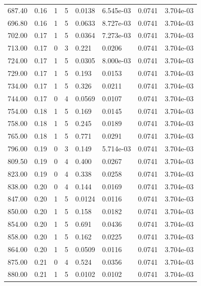 \documentclass[preview]{standalone}
\begin{document}
{{{{\begin{tabular}{L{1.2cm}C{1.2cm} C{0.3cm}C{0.5cm} C{1.4cm}C{1.4cm} C{1.4cm}C{1.4cm}}
  687.40  &  0.16  & 1     &  5 &  0.0138  & 6.545e-03  & 0.0741 &  3.704e-03   \\ 
  696.80  &  0.16  & 1     &  5 &  0.0633  & 8.727e-03  & 0.0741 &  3.704e-03   \\ 
  702.00  &  0.17  & 1     &  5 &  0.0364  & 7.273e-03  & 0.0741 &  3.704e-03   \\ 
  713.00  &  0.17  & 0     &  3 &  0.221  & 0.0206  & 0.0741 &  3.704e-03   \\ 
  724.00  &  0.17  & 1     &  5 &  0.0305  & 8.000e-03  & 0.0741 &  3.704e-03   \\ 
  729.00  &  0.17  & 1     &  5 &  0.193  & 0.0153  & 0.0741 &  3.704e-03   \\ 
  734.00  &  0.17  & 1     &  5 &  0.326  & 0.0211  & 0.0741 &  3.704e-03   \\ 
  744.00  &  0.17  & 0     &  4 &  0.0569  & 0.0107  & 0.0741 &  3.704e-03   \\ 
  754.00  &  0.18  & 1     &  5 &  0.169  & 0.0145  & 0.0741 &  3.704e-03   \\ 
  758.00  &  0.18  & 1     &  5 &  0.245  & 0.0189  & 0.0741 &  3.704e-03   \\ 
  765.00  &  0.18  & 1     &  5 &  0.771  & 0.0291  & 0.0741 &  3.704e-03   \\ 
  796.00  &  0.19  & 0     &  3 &  0.149  & 5.714e-03  & 0.0741 &  3.704e-03   \\ 
  809.50  &  0.19  & 0     &  4 &  0.400  & 0.0267  & 0.0741 &  3.704e-03   \\ 
  823.00  &  0.19  & 0     &  4 &  0.338  & 0.0258  & 0.0741 &  3.704e-03   \\ 
  838.00  &  0.20  & 0     &  4 &  0.144  & 0.0169  & 0.0741 &  3.704e-03   \\ 
  847.00  &  0.20  & 1     &  5 &  0.0124  & 0.0116  & 0.0741 &  3.704e-03   \\ 
  850.00  &  0.20  & 1     &  5 &  0.158  & 0.0182  & 0.0741 &  3.704e-03   \\ 
  854.00  &  0.20  & 1     &  5 &  0.691  & 0.0436  & 0.0741 &  3.704e-03   \\ 
  858.00  &  0.20  & 1     &  5 &  0.162  & 0.0225  & 0.0741 &  3.704e-03   \\ 
  864.00  &  0.20  & 1     &  5 &  0.0509  & 0.0116  & 0.0741 &  3.704e-03   \\ 
  875.00  &  0.21  & 0     &  4 &  0.524  & 0.0356  & 0.0741 &  3.704e-03   \\ 
  880.00  &  0.21  & 1     &  5 &  0.0102  & 0.0102  & 0.0741 &  3.704e-03   \\ 

\end{tabular}}}}}
\end{document}
